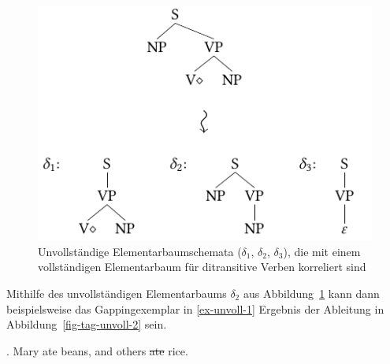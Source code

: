 \begin{figure}[t]
\centering
\includegraphics[angle=90]{graphics/abb830.pdf}
\caption{\label{fig-tag-unvoll-1}Unvollständige Elementarbaumschemata ($\delta_1$, $\delta_2$, $\delta_3$), die mit einem vollständigen Elementarbaum für ditransitive Verben korreliert sind}
\end{figure}

Mithilfe des unvollständigen Elementarbaums $\delta_2$ aus Abbildung~\ref{fig-tag-unvoll-1} kann dann beispielsweise das Gappingexemplar in \ref{ex-unvoll-1} Ergebnis der Ableitung in Abbildung~\ref{fig-tag-unvoll-2} sein.

\ex. \label{ex-unvoll-1} Mary ate beans, and others \sout{ate} rice. %
 
